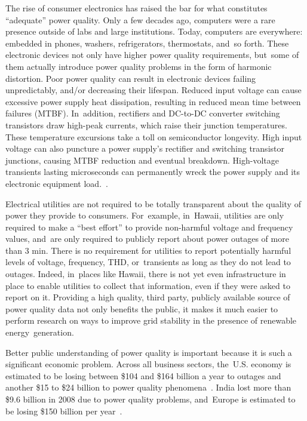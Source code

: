 \documentclass[energies,article,accept,moreauthors,pdftex]{Definitions/mdpi}
\begin{document}
 The rise of consumer electronics has raised the bar for what constitutes ``adequate'' power quality. Only a few decades ago, computers were a rare presence outside of labs and large institutions. Today, computers are everywhere: embedded in phones, washers, refrigerators, thermostats, and~so forth. These electronic devices not only have higher power quality requirements, but~some of them actually introduce power quality problems in the form of harmonic distortion. Poor power quality can result in electronic devices failing unpredictably, and/or decreasing their lifespan. Reduced input voltage can cause excessive power supply heat dissipation, resulting in reduced mean time between failures (MTBF). In~addition, rectifiers and DC-to-DC converter switching transistors draw high-peak currents, which raise their junction temperatures. These temperature excursions take a toll on semiconductor longevity. High input voltage can also puncture a power supply's rectifier and switching transistor junctions, causing MTBF reduction and eventual breakdown. High-voltage transients lasting microseconds can permanently wreck the power supply and its electronic equipment load.~\cite{dedad_when_2008}.

 Electrical utilities are not required to be totally transparent about the quality of power they provide to consumers. For~example, in~Hawaii, utilities are only required to make a ``best effort'' to provide non-harmful voltage and frequency values, and~are only required to publicly report about power outages of more than 3 min. There is no requirement for utilities to report potentially harmful levels of voltage, frequency, THD, or~transients as long as they do not lead to outages. Indeed, in~places like Hawaii, there is not yet even infrastructure in place to enable utilities to collect that information, even if they were asked to report on it. Providing a high quality, third party, publicly available source of power quality data not only benefits the public, it makes it much easier to perform research on ways to improve grid stability in the presence of renewable energy~generation.

Better public understanding of power quality is important because it is such a significant economic problem. Across all business sectors, the~U.S. economy is estimated to be losing between \$104 and \$164 billion a year to outages and another \$15 to \$24 billion to power quality phenomena~\cite{elphick_summary_2015}. India lost more than \$9.6 billion in 2008 due to power quality problems, and~Europe is estimated to be losing \$150 billion per year~\cite{laskar_power_2012}.
\end{document}
